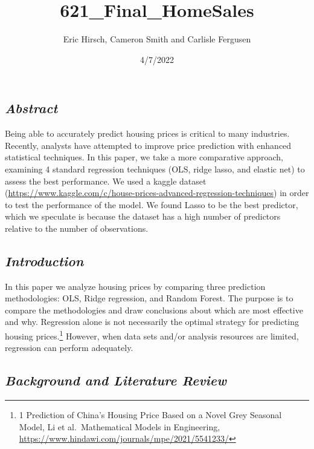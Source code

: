 \documentclass[
]{article}
\title{621\_Final\_HomeSales}
\author{Eric Hirsch, Cameron Smith and Carlisle Fergusen}
\date{4/7/2022}
\begin{document}
\maketitle

{
\setcounter{tocdepth}{4}
\tableofcontents
}
\hypertarget{abstract}{%
\subsection{\texorpdfstring{\emph{Abstract}}{Abstract}}\label{abstract}}

Being able to accurately predict housing prices is critical to many
industries. Recently, analysts have attempted to improve price
prediction with enhanced statistical techniques. In this paper, we take
a more comparative approach, examining 4 standard regression techniques
(OLS, ridge lasso, and elastic net) to assess the best performance. We
used a kaggle dataset
(\url{https://www.kaggle.com/c/house-prices-advanced-regression-techniques})
in order to test the performance of the model. We found Lasso to be the
best predictor, which we speculate is because the dataset has a high
number of predictors relative to the number of observations.

\hypertarget{introduction}{%
\subsection{\texorpdfstring{\emph{Introduction}}{Introduction}}\label{introduction}}

In this paper we analyze housing prices by comparing three prediction
methodologies: OLS, Ridge regression, and Random Forest. The purpose is
to compare the methodologies and draw conclusions about which are most
effective and why. Regression alone is not necessarily the optimal
strategy for predicting housing prices.\footnote{1 Prediction of China's
  Housing Price Based on a Novel Grey Seasonal Model, Li et
  al.~Mathematical Models in Engineering,
  \url{https://www.hindawi.com/journals/mpe/2021/5541233/}} However,
when data sets and/or analysis resources are limited, regression can
perform adequately.

\hypertarget{background-and-literature-review}{%
\subsection{\texorpdfstring{\emph{Background and Literature
Review}}{Background and Literature Review}}\label{background-and-literature-review}}
\end{document}

